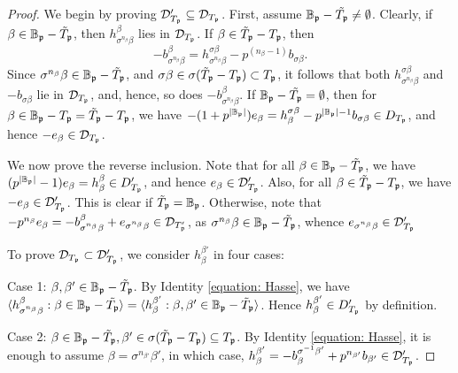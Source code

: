 \documentclass[11pt,pdflatex]{amsart}
\theoremstyle{plain}
\theoremstyle{definition}
\theoremstyle{plain}
\theoremstyle{definition}
\theoremstyle{remark}
\numberwithin{equation}{section}
\numberwithin{figure}{section} \numberwithin{table}{subsection}
\newcommand{\gerp}{{\frak{p}}}
\newcommand{\calD}{{\mathcal{D}}}
\def\BB{\mathbb{B}}
\begin{document}
\begin{proof}  We begin by proving  $\calD'_{T_\gerp}\subseteq \calD_{T_\gerp}$. First, assume $\BB_\gerp-\tilde{T_\gerp}\neq \emptyset$. Clearly, if $\beta \in \BB_\gerp-\tilde{T}_\gerp$, then $h_{\sigma^{n_\beta}\beta}^\beta$ lies in $\calD_{T_\gerp}$. If $\beta \in \tilde{T}_\gerp-T_\gerp$, then 
\[
-b_{\sigma^{n_\beta}\beta}^\beta=h_{\sigma^{n_\beta}\beta}^{\sigma\beta}-p^{(n_\beta-1)}b_{\sigma\beta}.
\]
Since $\sigma^{n_\beta}\beta \in \BB_\gerp-\tilde{T}_\gerp$, and $\sigma\beta \in \sigma(\tilde{T}_\gerp-T_\gerp) \subset T_\gerp$, it follows that both $h_{\sigma^{n_\beta}\beta}^{\sigma\beta}$ and $-b_{\sigma\beta}$ lie in $\calD_{T_\gerp}$, and, hence, so does $-b_{\sigma^{n_\beta}\beta}^\beta$.  If $\BB_\gerp-\tilde{T_\gerp}=\emptyset$, then for $\beta \in \BB_\gerp-T_\gerp=\tilde{T}_\gerp-T_\gerp$, we have $-(1+p^{|\BB_\gerp|})e_\beta=h_\beta^{\sigma\beta}-{p^{|\BB_\gerp|-1}}b_{\sigma\beta} \in D_{T_\gerp}$, and hence $-e_\beta \in \calD_{T_\gerp}$.

We now prove the reverse inclusion. Note that for all $\beta \in \BB_\gerp-\tilde{T}_\gerp$, we have $(p^{|\BB_\gerp|}-1)e_\beta=h_\beta^\beta \in D'_{T_\gerp}$, and hence $e_\beta \in \calD'_{T_\gerp}$. Also, for all $\beta \in \tilde{T}_\gerp-T_\gerp $, we have $-e_\beta \in \calD'_{T_\gerp}$. This is clear if $\tilde{T}_\gerp=\BB_\gerp$. Otherwise, note that $-p^{n_\beta}e_\beta=-b_{\sigma^{n_\beta}\beta}^\beta+e_{\sigma^{n_\beta}\beta} \in \calD_{T'_\gerp}$, as $\sigma^{n_\beta}\beta\in \BB_\gerp-\tilde{T}_\gerp$, whence $e_{\sigma^{n_\beta}\beta} \in \calD'_{T_\gerp}$

To prove $\calD_{T_\gerp}\subset \calD'_{T_\gerp}$, we consider $h_{\beta}^{\beta'}$ in four cases:

\noindent Case 1: $\beta,\beta' \in \BB_\gerp-\tilde{T}_\gerp$. By Identity \ref{equation: Hasse}, we have 
$\langle h_{\sigma^{n_\beta}\beta}^{\beta}: \beta \in \BB_\gerp-\tilde{T_\gerp} \rangle = \langle h_\beta^{\beta'}: \beta,\beta' \in \BB_\gerp-\tilde{T}_\gerp\rangle$. Hence $h_\beta^{\beta'} \in D'_{T_\gerp}$ by definition.

\vspace{2mm}

\noindent Case 2: $\beta \in \BB_\gerp-\tilde{T}_\gerp, \beta' \in \sigma(\tilde{T}_\gerp-T_\gerp)\subseteq T_\gerp$. By Identity \ref{equation: Hasse}, it is enough to assume $\beta=\sigma^{n_{\beta'}}{\beta'}$, in which case, $h_\beta^{\beta'}=-b_\beta^{\sigma^{-1}\beta'} +p^{n_{\beta'}}b_{\beta'} \in \calD'_{T_\gerp}$.


\end{proof}
\end{document}
